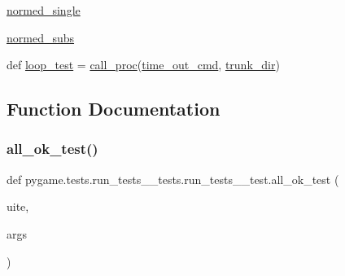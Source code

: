\begin{DoxyCompactItemize}
\item 
\hyperlink{namespacepygame_1_1tests_1_1run__tests____tests_1_1run__tests____test_a3beb326665e63fdeaf942d6f2514ce9f}{normed\+\_\+single}
\item 
\hyperlink{namespacepygame_1_1tests_1_1run__tests____tests_1_1run__tests____test_afeb11dc462ebaa499976349ae7d8e7a8}{normed\+\_\+subs}
\item 
def \hyperlink{namespacepygame_1_1tests_1_1run__tests____tests_1_1run__tests____test_acfd11422eb408f5ace13d10be5edc58e}{loop\+\_\+test} = \hyperlink{namespacepygame_1_1tests_1_1run__tests____tests_1_1run__tests____test_ad1f40285def0d59ba6f9cd875d89cf12}{call\+\_\+proc}(\hyperlink{namespacepygame_1_1tests_1_1run__tests____tests_1_1run__tests____test_adba3ea65bf33473fdea0aa63c68e4363}{time\+\_\+out\+\_\+cmd}, \hyperlink{namespacepygame_1_1tests_1_1run__tests____tests_1_1run__tests____test_ac47439728c7bd48859ece030bf6e3d52}{trunk\+\_\+dir})
\end{DoxyCompactItemize}


\subsection{Function Documentation}
\mbox{\label{namespacepygame_1_1tests_1_1run__tests____tests_1_1run__tests____test_afd58757da8048b03ce7fd43c01814309}} 
\subsubsection{\texorpdfstring{all\+\_\+ok\+\_\+test()}{all\_ok\_test()}}
{\footnotesize\ttfamily def pygame.\+tests.\+run\+\_\+tests\+\_\+\+\_\+tests.\+run\+\_\+tests\+\_\+\+\_\+test.\+all\+\_\+ok\+\_\+test (\begin{DoxyParamCaption}\item[{}]{uite,  }\item[{}]{args }\end{DoxyParamCaption})}


